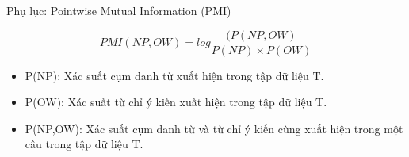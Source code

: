 \documentclass[9pt,xcolor=table,hyperref=unicode]{beamer}
\begin{document}
		\begin{frame}{Phụ lục: Pointwise Mutual Information (PMI)}
				\begin{center}
						\begin{equation*}
						PMI(NP,OW) = log\frac{(P(NP,OW)}{P(NP)\times P(OW)}
						\end{equation*}
				\end{center}
				\begin{itemize} 
						\item{P(NP): Xác suất cụm danh từ xuất hiện trong tập dữ liệu T.}
						\item{P(OW): Xác suất từ chỉ ý kiến xuất hiện trong tập dữ liệu T.}
						\item{P(NP,OW): Xác suất cụm danh từ và từ chỉ ý kiến cùng xuất hiện trong một câu trong tập dữ liệu T.}
					\end{itemize}
		\end{frame}
\end{document}
